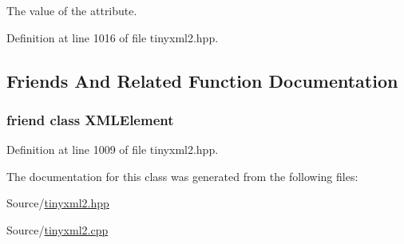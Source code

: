 The value of the attribute. 



Definition at line 1016 of file tinyxml2.\-hpp.



\subsection{Friends And Related Function Documentation}
\hypertarget{classtinyxml2_1_1_x_m_l_attribute_ac2fba9b6e452829dd892f7392c24e0eb}{
\subsubsection[{X\-M\-L\-Element}]{\setlength{\rightskip}{0pt plus 5cm}friend class {\bf X\-M\-L\-Element}\hspace{0.3cm}{\ttfamily [friend]}}}\label{classtinyxml2_1_1_x_m_l_attribute_ac2fba9b6e452829dd892f7392c24e0eb}


Definition at line 1009 of file tinyxml2.\-hpp.



The documentation for this class was generated from the following files\-:\begin{DoxyCompactItemize}
\item 
Source/\hyperlink{tinyxml2_8hpp}{tinyxml2.\-hpp}\item 
Source/\hyperlink{tinyxml2_8cpp}{tinyxml2.\-cpp}\end{DoxyCompactItemize}
